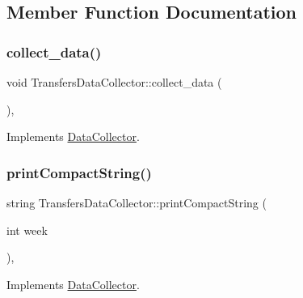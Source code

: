 \subsection{Member Function Documentation}
\mbox{\label{classTransfersDataCollector_a2f5c4427699aab547ea0d3b74993752b_a2f5c4427699aab547ea0d3b74993752b}} 
\subsubsection{\texorpdfstring{collect\+\_\+data()}{collect\_data()}}
{\footnotesize\ttfamily void Transfers\+Data\+Collector\+::collect\+\_\+data (\begin{DoxyParamCaption}{ }\end{DoxyParamCaption})\hspace{0.3cm}{\ttfamily [override]}, {\ttfamily [virtual]}}



Implements \mbox{\hyperlink{classDataCollector_a01486bf58acbe37b203f97b3b9a79c40_a01486bf58acbe37b203f97b3b9a79c40}{Data\+Collector}}.

\mbox{\label{classTransfersDataCollector_aa5385877143c67a4d300032160239cfe_aa5385877143c67a4d300032160239cfe}} 
\subsubsection{\texorpdfstring{print\+Compact\+String()}{printCompactString()}}
{\footnotesize\ttfamily string Transfers\+Data\+Collector\+::print\+Compact\+String (\begin{DoxyParamCaption}\item[{int}]{week }\end{DoxyParamCaption})\hspace{0.3cm}{\ttfamily [override]}, {\ttfamily [virtual]}}



Implements \mbox{\hyperlink{classDataCollector_a2eac264fa5612aed5a830b12de4f4ae3_a2eac264fa5612aed5a830b12de4f4ae3}{Data\+Collector}}.

